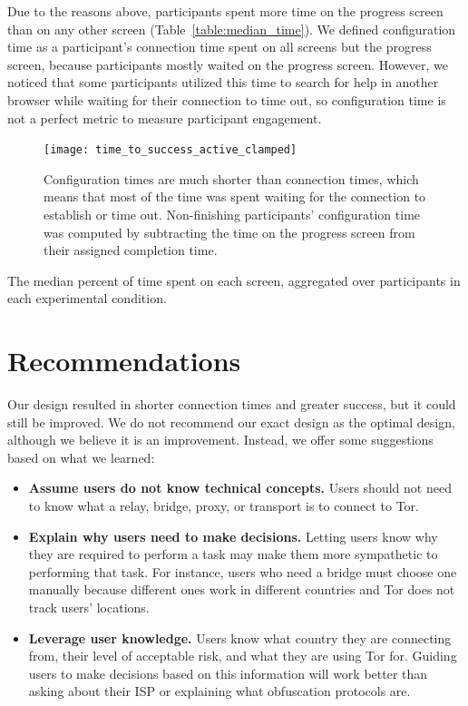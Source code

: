 \documentclass[USenglish,oneside,twocolumn]{article}
\begin{document}
Due to the reasons above, participants spent more time on the progress screen than on any other screen (Table~\ref{table:median_time}). We defined configuration time as a participant's connection time spent on all screens but the progress screen, because participants mostly waited on the progress screen. However, we noticed that some participants utilized this time to search for help in another browser while waiting for their connection to time out, so configuration time is not a perfect metric to measure participant engagement. 

\begin{figure}[t]
\centering
\texttt{[image: time\_to\_success\_active\_clamped]}
\caption{
Configuration times are much shorter than connection times, which means that most of the time was spent waiting for the connection to establish or time out. Non-finishing participants' configuration time was computed by subtracting the time on the progress screen from their assigned completion time.
}
\label{fig:time_to_success_active_clamped}
\end{figure}

\begin{table}[t]
\centering

\caption{
The median percent of time spent on each screen, aggregated over participants in each experimental condition.}
\label{table:median_time}
\end{table}


\section{Recommendations}
\label{sec:recommendations}
Our design resulted in shorter connection times and greater success,  but it could still be improved. We do not recommend our exact design as the optimal design, although we believe it is an improvement. Instead, we offer some suggestions based on what we learned: \\
 
\begin{itemize}
\item {\bfseries Assume users do not know technical concepts.} Users should not need to know what a relay, bridge, proxy, or transport is to connect to Tor. 
\item {\bfseries Explain why users need to make decisions.} Letting users know why they are required to perform a task may make them more sympathetic to  performing that task. For instance, users who need a bridge must choose one manually because different ones work in different countries and Tor does not track users' locations.  
\item {\bfseries Leverage user knowledge.} Users know what country they are connecting from, their level of acceptable risk, and what they are using Tor for. Guiding users to make decisions based on this information will work better than asking about their ISP or explaining what obfuscation protocols are. 
\end{itemize}
\end{document}
